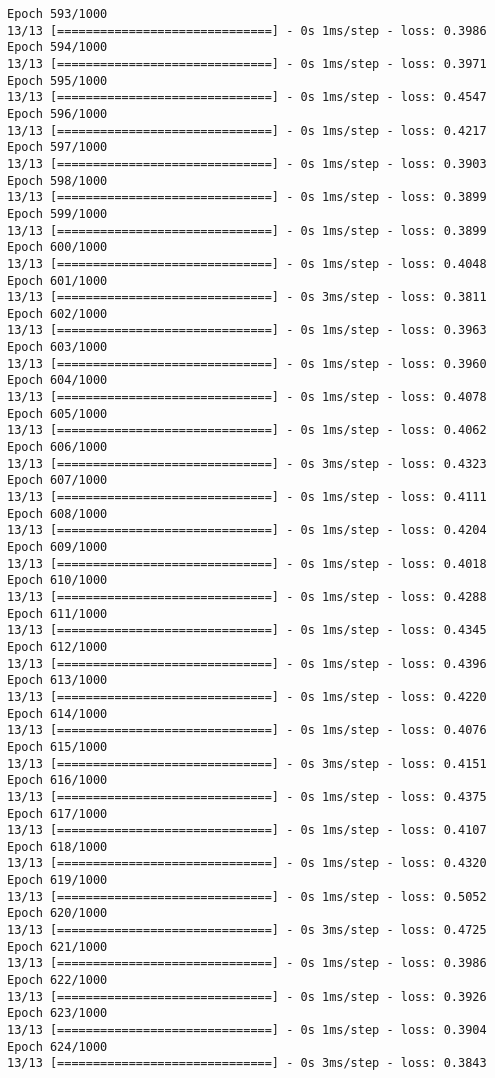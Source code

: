 \documentclass[11pt]{article}
\begin{document}
\begin{Verbatim}[commandchars=\\\{\}]
Epoch 593/1000
13/13 [==============================] - 0s 1ms/step - loss: 0.3986
Epoch 594/1000
13/13 [==============================] - 0s 1ms/step - loss: 0.3971
Epoch 595/1000
13/13 [==============================] - 0s 1ms/step - loss: 0.4547
Epoch 596/1000
13/13 [==============================] - 0s 1ms/step - loss: 0.4217
Epoch 597/1000
13/13 [==============================] - 0s 1ms/step - loss: 0.3903
Epoch 598/1000
13/13 [==============================] - 0s 1ms/step - loss: 0.3899
Epoch 599/1000
13/13 [==============================] - 0s 1ms/step - loss: 0.3899
Epoch 600/1000
13/13 [==============================] - 0s 1ms/step - loss: 0.4048
Epoch 601/1000
13/13 [==============================] - 0s 3ms/step - loss: 0.3811
Epoch 602/1000
13/13 [==============================] - 0s 1ms/step - loss: 0.3963
Epoch 603/1000
13/13 [==============================] - 0s 1ms/step - loss: 0.3960
Epoch 604/1000
13/13 [==============================] - 0s 1ms/step - loss: 0.4078
Epoch 605/1000
13/13 [==============================] - 0s 1ms/step - loss: 0.4062
Epoch 606/1000
13/13 [==============================] - 0s 3ms/step - loss: 0.4323
Epoch 607/1000
13/13 [==============================] - 0s 1ms/step - loss: 0.4111
Epoch 608/1000
13/13 [==============================] - 0s 1ms/step - loss: 0.4204
Epoch 609/1000
13/13 [==============================] - 0s 1ms/step - loss: 0.4018
Epoch 610/1000
13/13 [==============================] - 0s 1ms/step - loss: 0.4288
Epoch 611/1000
13/13 [==============================] - 0s 1ms/step - loss: 0.4345
Epoch 612/1000
13/13 [==============================] - 0s 1ms/step - loss: 0.4396
Epoch 613/1000
13/13 [==============================] - 0s 1ms/step - loss: 0.4220
Epoch 614/1000
13/13 [==============================] - 0s 1ms/step - loss: 0.4076
Epoch 615/1000
13/13 [==============================] - 0s 3ms/step - loss: 0.4151
Epoch 616/1000
13/13 [==============================] - 0s 1ms/step - loss: 0.4375
Epoch 617/1000
13/13 [==============================] - 0s 1ms/step - loss: 0.4107
Epoch 618/1000
13/13 [==============================] - 0s 1ms/step - loss: 0.4320
Epoch 619/1000
13/13 [==============================] - 0s 1ms/step - loss: 0.5052
Epoch 620/1000
13/13 [==============================] - 0s 3ms/step - loss: 0.4725
Epoch 621/1000
13/13 [==============================] - 0s 1ms/step - loss: 0.3986
Epoch 622/1000
13/13 [==============================] - 0s 1ms/step - loss: 0.3926
Epoch 623/1000
13/13 [==============================] - 0s 1ms/step - loss: 0.3904
Epoch 624/1000
13/13 [==============================] - 0s 3ms/step - loss: 0.3843

\end{Verbatim}
\end{document}
